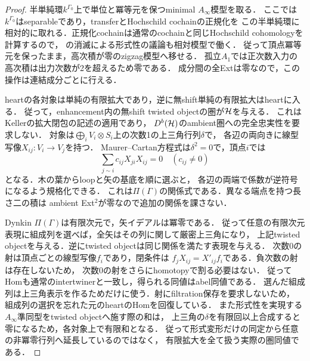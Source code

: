 \begin{proof}
半単純環$k^{\Gamma_0}$上で単位と冪等元を保つminimal $A_\infty$模型を取る．
ここでは$k^{\Gamma_0}$はseparableであり，transferとHochschild cochainの正規化を
この半単純環に相対的に取れる．正規化cochainは通常のcochainと同じHochschild cohomologyを計算するので，
\cite[Theorem 4.2, \S4.4]{LiuWangZigzag}の消滅による形式性の議論も相対模型で働く．
従って頂点冪等元を保ったまま，高次積が零のzigzag模型へ移せる．
孤立$A_1$では正次数入力の高次積は出力次数が2を超えるため零である．
成分間の全Extは零なので，この操作は連結成分ごとに行える．

heartの各対象は単純の有限拡大であり，逆に無shift単純の有限拡大はheartに入る．
従って，enhancement内の無shift twisted objectの圏が$\mathcal H$を与える．
これはKellerの拡大閉包の記述\cite[\S\S6.5, 7.5, 7.7]{KellerAinf}の適用であり，
$D^b(\mathcal H)$のambient圏への完全忠実性を要求しない．
対象は$\bigoplus_i V_i\otimes S_i$上の次数1の上三角行列$\delta$で，
各辺の両向きに線型写像$X_{ij}:V_i\to V_j$を持つ．
Maurer--Cartan方程式は$\delta^2=0$で，頂点$i$では
\[
 \sum_{j\sim i}c_{ij}X_{ji}X_{ij}=0\quad(c_{ij}\ne0)
\]
となる．木の葉からloopと矢の基底を順に選ぶと，
各辺の両端で係数が逆符号になるよう規格化できる．
これは$\Pi(\Gamma)$の関係式である．異なる端点を持つ長さ二の積は
ambient Ext$^2$が零なので追加の関係を課さない．

Dynkin $\Pi(\Gamma)$は有限次元で，矢イデアルは冪零である．
従って任意の有限次元表現に組成列を選べば，全矢はその列に関して厳密上三角になり，
上記twisted objectを与える．逆にtwisted objectは同じ関係を満たす表現を与える．
次数0の射は頂点ごとの線型写像$f_i$であり，閉条件は
$f_jX_{ij}=X'_{ij}f_i$である．負次数の射は存在しないため，
次数0の射をさらにhomotopyで割る必要はない．
従ってHomも通常のintertwinerと一致し，得られる同値はabel同値である．
選んだ組成列は上三角表示を作るためだけに使う．射にfiltration保存を要求しないため，
組成列の選択を忘れた元のheartのHomを回復している．
また形式性を実現する$A_\infty$準同型をtwisted objectへ施す際の和は，
上三角の$\delta$を有限回以上合成すると零になるため，各対象上で有限和となる．
従って形式変形だけの同定から任意の非冪零行列へ延長しているのではなく，
有限拡大を全て扱う実際の圏同値である．
\end{proof}

